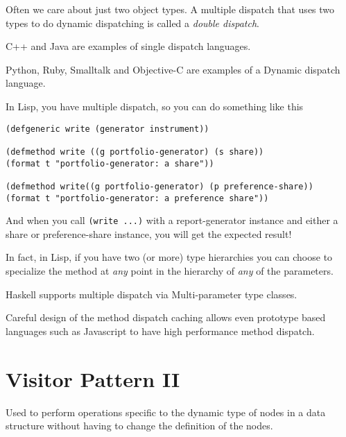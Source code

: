 Often we care about just two object types. A multiple dispatch that 
uses two types to do dynamic dispatching is called a \textit{double dispatch}. 






C++ and Java are examples of single dispatch languages. 

Python, Ruby, Smalltalk and Objective-C are examples of a Dynamic dispatch language.

\frmrule

In Lisp, you have multiple dispatch, so you can do something like this

\begin{lstlisting}
(defgeneric write (generator instrument))

(defmethod write ((g portfolio-generator) (s share))
(format t "portfolio-generator: a share"))

(defmethod write((g portfolio-generator) (p preference-share))
(format t "portfolio-generator: a preference share"))
\end{lstlisting}

And when you call \lstinline{(write ...)} with a report-generator 
instance and either a share or preference-share instance, you will get the expected result!

In fact, in Lisp, if you have two (or more) type hierarchies you can 
choose to specialize the method at \textit{any} point in the hierarchy of \textit{any} 
of the parameters. 

Haskell supports multiple dispatch 
via Multi-parameter type classes.



\frmrule

Careful design of the method dispatch caching allows even prototype based languages 
such as Javascript to have high performance method dispatch.




\section{Visitor Pattern II}


Used to perform operations specific to the dynamic type of nodes in a data structure without 
having to change the definition of the nodes.



